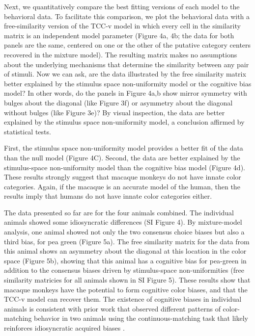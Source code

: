 Next, we quantitatively compare the best fitting versions of each model to the behavioral data. 
To facilitate this comparison, we plot the behavioral data with a free-similarity version of the TCC-v model in which every cell in the similarity matrix is an independent model parameter (Figure 4a, 4b; the data for both panels are the same, centered on one or the other of the putative category centers recovered in the mixture model). 
The resulting matrix makes no assumptions about the underlying mechanisms that determine the similarity between any pair of stimuli. 
Now we can ask, are the data illustrated by the free similarity matrix better explained by the stimulus space non-uniformity model or the cognitive bias model? 
In other words, do the panels in Figure 4a,b show mirror symmetry with bulges about the diagonal (like Figure 3f) or asymmetry about the diagonal without bulges (like Figure 3e)? By visual inspection, the data are better explained by the stimulus space non-uniformity model, a conclusion affirmed by statistical tests. 

First, the stimulus space non-uniformity model provides a better fit of the data than the null model (Figure 4C). 
Second, the data are better explained by the stimulus-space non-uniformity model than the cognitive bias model (Figure 4d). 
These results strongly suggest that macaque monkeys do not have innate color categories. 
Again, if the macaque is an accurate model of the human, then the results imply that humans do not have innate color categories either. 

The data presented so far are for the four animals combined. 
The individual animals showed some idiosyncratic differences (SI Figure 4).
By mixture-model analysis, one animal showed not only the two consensus choice biases but also a third bias, for pea green (Figure 5a). 
The free similarity matrix for the data from this animal shows an asymmetry about the diagonal at this location in the color space (Figure 5b), showing that this animal has a cognitive bias for pea-green in addition to the consensus biases driven by stimulus-space non-uniformities (free similarity matricies for all animals shown in SI Figure 5). 
These results show that macaque monkeys have the potential to form cognitive color biases, and that the TCC-v model can recover them. The existence of cognitive biases in individual animals is consistent with prior work that observed different patterns of color-matching behavior in two animals using the continuous-matching task that likely reinforces idiosyncratic acquired biases \citep{panichello_error-correcting_2019}.


